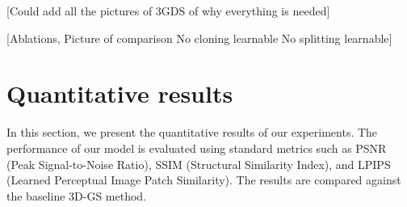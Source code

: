 \documentclass[12pt]{report}
\begin{document}



[Could add all the pictures of 3GDS of why everything is needed]

[Ablations, Picture of comparison
 No cloning learnable
No splitting learnable]

\section{Quantitative results}
In this section, we present the quantitative results of our experiments. The performance of our model is evaluated using standard metrics such as PSNR (Peak Signal-to-Noise Ratio), SSIM (Structural Similarity Index), and LPIPS (Learned Perceptual Image Patch Similarity). The results are compared against the baseline 3D-GS method.
\end{document}
